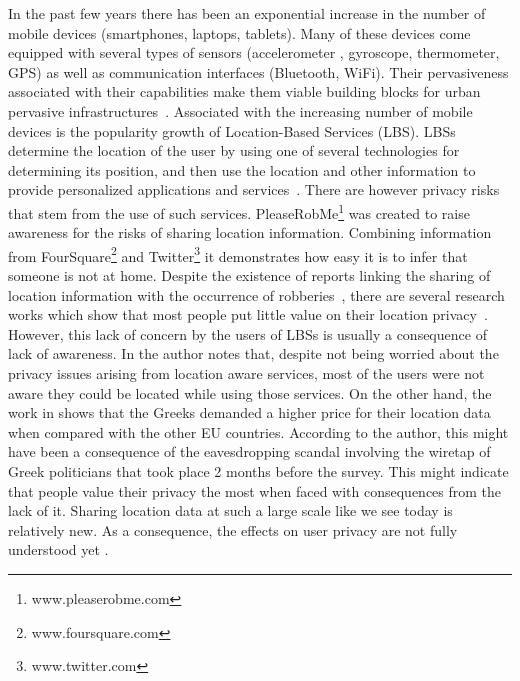 In the past few years there has been an exponential increase in the
number of mobile devices (smartphones, laptops, tablets). Many of
these devices come equipped with several types of sensors
(accelerometer , gyroscope, thermometer, GPS) as well as communication
interfaces (Bluetooth, WiFi). Their pervasiveness associated with
their capabilities make them viable building blocks for urban
pervasive infrastructures~\cite{kostakos2009understanding}. Associated
with the increasing number of mobile devices is the popularity growth
of Location-Based Services (LBS)\cite{zickuhr2012three}. LBSs
determine the location of the user by using one of several
technologies for determining its position, and then use the location and
other information to provide personalized applications and
services~\cite{zibuschka2011location}. There are however privacy risks
that stem from the use of such services.
PleaseRobMe\footnote{www.pleaserobme.com} was created to raise awareness
for the risks of sharing location information. Combining information
from FourSquare\footnote{www.foursquare.com} and
Twitter\footnote{www.twitter.com} it demonstrates how easy it is to
infer that someone is not at home. Despite the existence of reports
linking the sharing of location information with the occurrence of
robberies~\cite{Grove:2009:Online,Dybwad:2009:Online}, there are
several research works which show that most people put little value on
their location privacy~\cite{ahern2007over,colbert2001diary,
  Cvrcek:2006:SVL:1179601.1179621,kaasinen2003user}. However, this
lack of concern by the users of LBSs is usually a consequence of lack
of awareness. In \cite{kaasinen2003user} the author notes that,
despite not being worried about the privacy issues arising from location aware
services, most of the users were not aware they could be located while
using those services. On the other hand, the work in
\cite{Cvrcek:2006:SVL:1179601.1179621} shows that the Greeks demanded
a higher price for their location data when compared with the other EU
countries. According to the author, this might have been a consequence
of the eavesdropping scandal involving the wiretap of Greek
politicians that took place 2 months before the survey. This might
indicate that people value their privacy the most when faced with
consequences from the lack of it. Sharing location data at such a
large scale like we see today is relatively new. As a consequence, the
effects on user privacy are not fully understood
yet \cite{Terrovitis:2011:PPD:2031331.2031334}.

